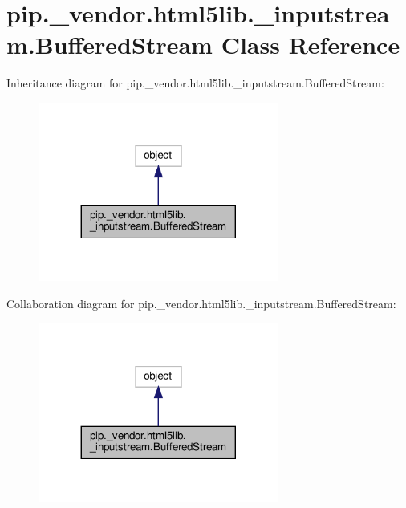 \hypertarget{classpip_1_1__vendor_1_1html5lib_1_1__inputstream_1_1BufferedStream}{}\section{pip.\+\_\+vendor.\+html5lib.\+\_\+inputstream.\+Buffered\+Stream Class Reference}
\label{classpip_1_1__vendor_1_1html5lib_1_1__inputstream_1_1BufferedStream}


Inheritance diagram for pip.\+\_\+vendor.\+html5lib.\+\_\+inputstream.\+Buffered\+Stream\+:
\nopagebreak
\begin{figure}[H]
\begin{center}
\leavevmode
\includegraphics[width=224pt]{classpip_1_1__vendor_1_1html5lib_1_1__inputstream_1_1BufferedStream__inherit__graph}
\end{center}
\end{figure}


Collaboration diagram for pip.\+\_\+vendor.\+html5lib.\+\_\+inputstream.\+Buffered\+Stream\+:
\nopagebreak
\begin{figure}[H]
\begin{center}
\leavevmode
\includegraphics[width=224pt]{classpip_1_1__vendor_1_1html5lib_1_1__inputstream_1_1BufferedStream__coll__graph}
\end{center}
\end{figure}
